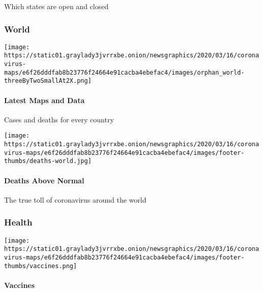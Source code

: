 Which states are open and closed

\hypertarget{world}{%
\subsubsection{World}\label{world}}

\href{https://www.nytimes3xbfgragh.onion/interactive/2020/world/coronavirus-maps.html}{}

\texttt{[image: https://static01.graylady3jvrrxbe.onion/newsgraphics/2020/03/16/coronavirus-maps/e6f26dddfab8b23776f24664e91cacba4ebefac4/images/orphan\_world-threeByTwoSmallAt2X.png]}

\hypertarget{latest-maps-and-data-1}{%
\paragraph{Latest Maps and Data}\label{latest-maps-and-data-1}}

Cases and deaths for every country

\href{https://www.nytimes3xbfgragh.onion/interactive/2020/04/21/world/coronavirus-missing-deaths.html}{}

\texttt{[image: https://static01.graylady3jvrrxbe.onion/newsgraphics/2020/03/16/coronavirus-maps/e6f26dddfab8b23776f24664e91cacba4ebefac4/images/footer-thumbs/deaths-world.jpg]}

\hypertarget{deaths-above-normal-1}{%
\paragraph{Deaths Above Normal}\label{deaths-above-normal-1}}

The true toll of coronavirus around the world

\hypertarget{health}{%
\subsubsection{Health}\label{health}}

\href{https://www.nytimes3xbfgragh.onion/interactive/2020/science/coronavirus-vaccine-tracker.html}{}

\texttt{[image: https://static01.graylady3jvrrxbe.onion/newsgraphics/2020/03/16/coronavirus-maps/e6f26dddfab8b23776f24664e91cacba4ebefac4/images/footer-thumbs/vaccines.png]}

\hypertarget{vaccines}{%
\paragraph{Vaccines}\label{vaccines}}


